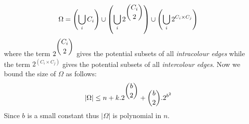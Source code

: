 \begin{equation*}
\Omega = \left(\bigcup_iC_i\right)\cup \left(\bigcup_i2^{\dbinom{C_i}{2}}\right) \cup\left(\bigcup_i2^{C_i\times C_j}\right)
\end{equation*}
where the term $2^{\dbinom{C_i}{2}}$ gives the potential subsets of all \emph{intracolour edges} while the term $2^{(C_i\times C_j)}$ gives the potential subsets of all \emph{intercolour edges}. Now we bound the size of $\Omega$ as follows:
\begin{equation*}
|\Omega| \leq n + k.2^{\dbinom{b}{2}} + \dbinom{b}{2}.2^{b^2}
\end{equation*}
Since $b$ is a small constant thus $|\Omega|$ is polynomial in $n$.
